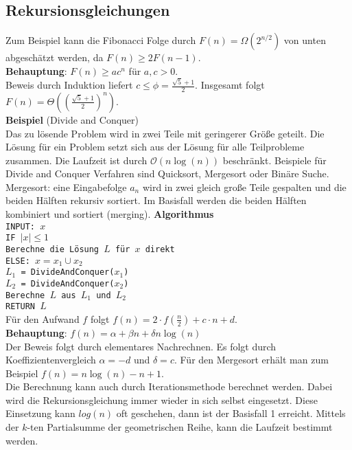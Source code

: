 \documentclass[a4paper, 12pt]{article}
\begin{document}
	\subsection{Rekursionsgleichungen}
	Zum Beispiel kann die Fibonacci Folge durch $F(n) = \Omega(2^{n/2})$ von unten abgeschätzt werden, da $F(n) \geq 2F(n-1)$.\\
	\textbf{Behauptung}: $F(n) \geq ac^n$ für $a,c >0$.\\ Beweis durch Induktion liefert $c \leq \phi = \frac{\sqrt{5}+1}{2}$. Insgesamt folgt $F(n) = \Theta((\frac{\sqrt{5}+1}{2})^n)$.\\
	\textbf{Beispiel} (Divide and Conquer)\\
	Das zu lösende Problem wird in zwei Teile mit geringerer Größe geteilt. Die Lösung für ein Problem setzt sich aus der Lösung für alle Teilprobleme zusammen. Die Laufzeit ist durch $\mathcal{O}(n\log(n))$ beschränkt. Beispiele für Divide and Conquer Verfahren sind Quicksort, Mergesort oder Binäre Suche.\\
	Mergesort: eine Eingabefolge $a_n$ wird in zwei gleich große Teile gespalten und die beiden Hälften rekursiv sortiert. Im Basisfall werden die beiden Hälften kombiniert und sortiert (merging).\newpage
	\textbf{Algorithmus}\\
	\texttt{INPUT: $x$\\
	IF $\left|x\right|\leq 1$\\
	\indent Berechne die Lösung $L$ für $x$ direkt\\
	ELSE: $x = x_1 \cup x_2$\\
	\indent $L_1$ = DivideAndConquer($x_1$)\\
	\indent $L_2$ = DivideAndConquer($x_2$)\\
	\indent Berechne $L$ aus $L_1$ und $L_2$\\
	RETURN $L$}\\
	Für den Aufwand $f$ folgt $f(n) = 2\cdot f(\frac{n}{2}) + c\cdot n + d$.	\\
	\textbf{Behauptung}: $f(n) = \alpha + \beta n +\delta n \log(n)$\\
	Der Beweis folgt durch elementares Nachrechnen. Es folgt durch Koeffizientenvergleich $\alpha = -d$ und $\delta = c$. Für den Mergesort erhält man zum Beispiel $f(n) = n\log(n) - n +1$.\\
	Die Berechnung kann auch durch Iterationsmethode berechnet werden. Dabei wird die Rekursionsgleichung immer wieder in sich selbst eingesetzt. Diese Einsetzung kann $log(n)$ oft geschehen, dann ist der Basisfall 1 erreicht. Mittels der $k$-ten Partialsumme der geometrischen Reihe, kann die Laufzeit bestimmt werden.\\
\end{document}
